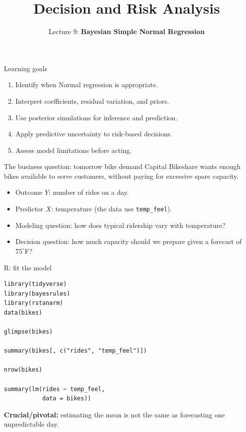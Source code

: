 \documentclass[aspectratio=43,11pt]{beamer}
\title{Decision and Risk Analysis}
\subtitle{Lecture 9: \textbf{Bayesian Simple Normal Regression}}
\author{}
\date{\color{aggiemaroon}{DAEN 427 / ISEN 427 / ISEN 627 - Fall 2026\\
      \textbf{Alexander Abuabara}}}
\begin{document}
\begin{frame}
\titlepage
\end{frame}

\begin{frame}{Learning goals}
\begin{enumerate}
\item Identify when Normal regression is appropriate.
\item Interpret coefficients, residual variation, and priors.
\item Use posterior simulations for inference and prediction.
\item Apply predictive uncertainty to risk-based decisions.
\item Assess model limitations before acting.
\end{enumerate}
\end{frame}

\begin{frame}{The business question: tomorrow bike demand}
Capital Bikeshare wants enough bikes available to serve customers, without paying for excessive spare capacity.
\begin{itemize}
\item Outcome $Y$: number of rides on a day.
\item Predictor $X$: temperature (the data use \texttt{temp\_feel}).
\item Modeling question: how does typical ridership vary with temperature?
\item Decision question: how much capacity should we prepare given a forecast of $75^\circ$F?
\end{itemize}
\end{frame}

\begin{frame}[fragile]{R: fit the model}
\footnotesize
\begin{verbatim}
library(tidyverse)
library(bayesrules)
library(rstanarm)
data(bikes)

glimpse(bikes)

summary(bikes[, c("rides", "temp_feel")])

nrow(bikes)

summary(lm(rides ~ temp_feel,
           data = bikes))
\end{verbatim}
\par\medskip\textbf{Crucial/pivotal:} estimating the mean is not the same as forecasting one unpredictable day.
\end{frame}
\end{document}
